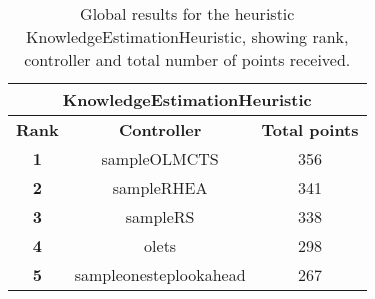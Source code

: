 \begin{table*}[!t]
\begin{center}
\begin{tabular}{|c|c|c|}
\multicolumn{3}{|c|}{\textbf{KnowledgeEstimationHeuristic}}\\
\hline
\textbf{Rank} & \textbf{Controller} & \textbf{Total points}\\
\hline
\textbf{1} & sampleOLMCTS & 356
 \\
\hline
\textbf{2} & sampleRHEA & 341
 \\
\hline
\textbf{3} & sampleRS & 338
 \\
\hline
\textbf{4} & olets & 298
 \\
\hline
\textbf{5} & sampleonesteplookahead & 267
 \\
\hline
\end{tabular}
\caption{Global results for the heuristic KnowledgeEstimationHeuristic, showing rank, controller and total number of points received.}
\label{tab:weights}
\end{center}
\end{table*}

